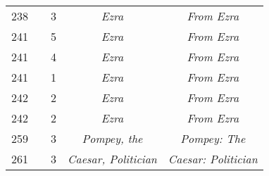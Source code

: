 \documentclass[a4paper,11pt]{article}
\numberwithin{equation}{section}
\begin{document}
\begin{center}
\begin{tabular}{|c|c|c|c|c|}
    238 & & \hphantom{0}3 & \textit{Ezra} & \textit{From Ezra} \\
    241 & & \hphantom{0}5 & \textit{Ezra} & \textit{From Ezra} \\
    241 & & \hphantom{0}4 & \textit{Ezra} & \textit{From Ezra} \\
    241 & & \hphantom{0}1 & \textit{Ezra} & \textit{From Ezra} \\
    242 & & \hphantom{0}2 & \textit{Ezra} & \textit{From Ezra} \\
    242 & & \hphantom{0}2 & \textit{Ezra} & \textit{From Ezra} \\
    259 & & \hphantom{0}3 & \textit{Pompey, the} & \textit{Pompey: The} \\
    261 & & \hphantom{0}3 & \textit{Caesar, Politician}
           & \textit{Caesar: Politician} \\
    \hline
  \end{tabular}





  \newpage


\end{center}
\end{document}
